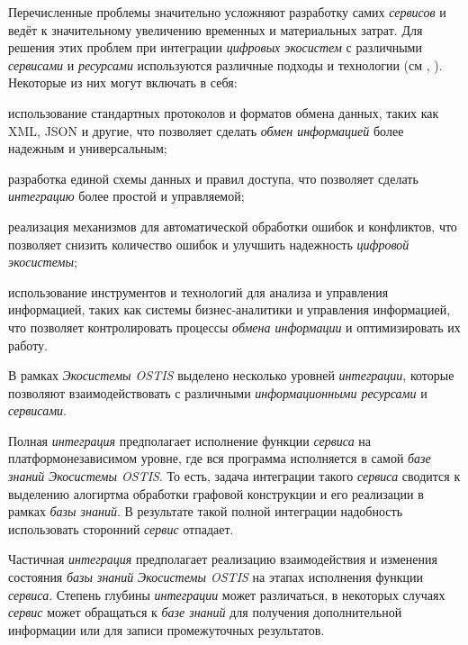 Перечисленные проблемы значительно усложняют разработку самих \textit{сервисов} и ведёт к значительному увеличению временных и материальных затрат. Для решения этих проблем при интеграции \textit{цифровых экосистем} с различными \textit{сервисами} и \textit{ресурсами} используются различные подходы и технологии (см , ). Некоторые из них могут включать в себя:

\begin{textitemize}
\item использование стандартных протоколов и форматов обмена данных, таких как XML, JSON и другие, что позволяет сделать \textit{обмен информацией} более надежным и универсальным;
\item разработка единой схемы данных и правил доступа, что позволяет сделать \textit{интеграцию} более простой и управляемой;
\item реализация механизмов для автоматической обработки ошибок и конфликтов, что позволяет снизить количество ошибок и улучшить надежность \textit{цифровой экосистемы};
\item использование инструментов и технологий для анализа и управления информацией, таких как системы бизнес-аналитики и управления информацией, что позволяет контролировать процессы \textit{обмена информации} и оптимизировать их работу.
\end{textitemize}


В рамках \textit{Экосистемы OSTIS} выделено несколько уровней \textit{интеграции}, которые позволяют взаимодействовать с различными \textit{информационными ресурсами} и \textit{сервисами}. 

Полная \textit{интеграция} предполагает исполнение функции \textit{сервиса} на платформонезависимом уровне, где вся программа исполняется в самой \textit{базе знаний} \textit{Экосистемы OSTIS}. То есть, задача интеграции такого \textit{сервиса} сводится к выделению алогиртма обработки графовой конструкции и его реализации в рамках \textit{базы знаний}. В результате такой полной интеграции надобность использовать сторонний \textit{сервис} отпадает. 

Частичная \textit{интеграция} предполагает реализацию взаимодействия и изменения состояния \textit{базы знаний} \textit{Экосистемы OSTIS} на этапах исполнения функции \textit{сервиса}. Степень глубины \textit{интеграции} может различаться, в некоторых случаях \textit{сервис} может обращаться к \textit{базе знаний} для получения дополнительной информации или для записи промежуточных результатов. 

